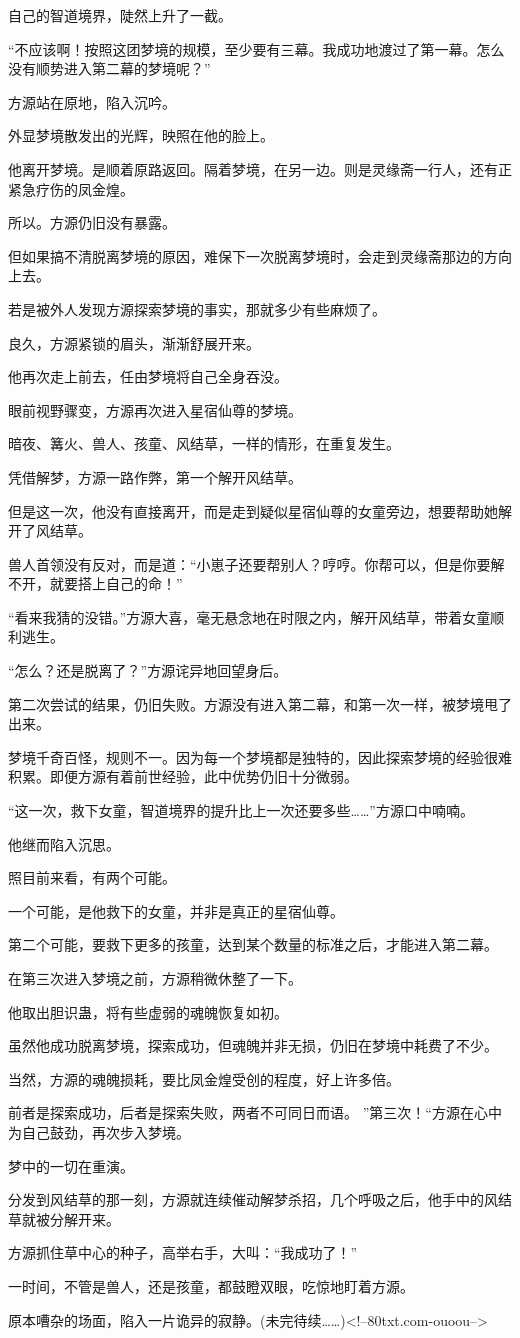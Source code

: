 \begin{this_body}
自己的智道境界，陡然上升了一截。

“不应该啊！按照这团梦境的规模，至少要有三幕。我成功地渡过了第一幕。怎么没有顺势进入第二幕的梦境呢？”

方源站在原地，陷入沉吟。

外显梦境散发出的光辉，映照在他的脸上。

他离开梦境。是顺着原路返回。隔着梦境，在另一边。则是灵缘斋一行人，还有正紧急疗伤的凤金煌。

所以。方源仍旧没有暴露。

但如果搞不清脱离梦境的原因，难保下一次脱离梦境时，会走到灵缘斋那边的方向上去。

若是被外人发现方源探索梦境的事实，那就多少有些麻烦了。

良久，方源紧锁的眉头，渐渐舒展开来。

他再次走上前去，任由梦境将自己全身吞没。

眼前视野骤变，方源再次进入星宿仙尊的梦境。

暗夜、篝火、兽人、孩童、风结草，一样的情形，在重复发生。

凭借解梦，方源一路作弊，第一个解开风结草。

但是这一次，他没有直接离开，而是走到疑似星宿仙尊的女童旁边，想要帮助她解开了风结草。

兽人首领没有反对，而是道：“小崽子还要帮别人？哼哼。你帮可以，但是你要解不开，就要搭上自己的命！”

“看来我猜的没错。”方源大喜，毫无悬念地在时限之内，解开风结草，带着女童顺利逃生。

“怎么？还是脱离了？”方源诧异地回望身后。

第二次尝试的结果，仍旧失败。方源没有进入第二幕，和第一次一样，被梦境甩了出来。

梦境千奇百怪，规则不一。因为每一个梦境都是独特的，因此探索梦境的经验很难积累。即便方源有着前世经验，此中优势仍旧十分微弱。

“这一次，救下女童，智道境界的提升比上一次还要多些……”方源口中喃喃。

他继而陷入沉思。

照目前来看，有两个可能。

一个可能，是他救下的女童，并非是真正的星宿仙尊。

第二个可能，要救下更多的孩童，达到某个数量的标准之后，才能进入第二幕。

在第三次进入梦境之前，方源稍微休整了一下。

他取出胆识蛊，将有些虚弱的魂魄恢复如初。

虽然他成功脱离梦境，探索成功，但魂魄并非无损，仍旧在梦境中耗费了不少。

当然，方源的魂魄损耗，要比凤金煌受创的程度，好上许多倍。

前者是探索成功，后者是探索失败，两者不可同日而语。 ”第三次！“方源在心中为自己鼓劲，再次步入梦境。

梦中的一切在重演。

分发到风结草的那一刻，方源就连续催动解梦杀招，几个呼吸之后，他手中的风结草就被分解开来。

方源抓住草中心的种子，高举右手，大叫：“我成功了！”

一时间，不管是兽人，还是孩童，都鼓瞪双眼，吃惊地盯着方源。

原本嘈杂的场面，陷入一片诡异的寂静。(未完待续……)<!--80txt.com-ouoou-->

\end{this_body}

